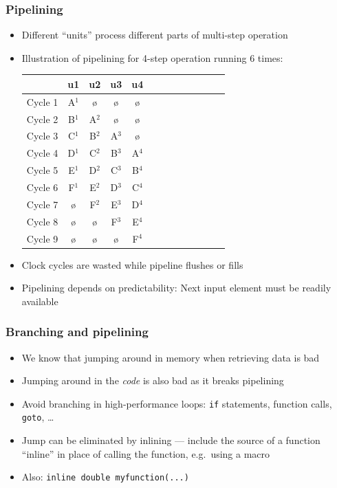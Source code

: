 \documentclass[usenames,dvipsnames,mathserif,compress]{beamer}
\begin{document}
\begin{frame}
  \frametitle{Pipelining}
  \begin{itemize}
  \item Different ``units'' process different parts of multi-step operation
  \item Illustration of pipelining for 4-step operation running 6 times:\\
    \begin{table}
    \begin{tabular}{c|cccccccccccc}
      & u1 &u2&u3&u4\\\hline
      Cycle 1 & A$^1$ &ø&ø&ø \\
      Cycle 2 & B$^1$ & A$^2$ &ø&ø \\
      Cycle 3 & C$^1$ & B$^2$ & A$^3$ &ø \\
      Cycle 4 & D$^1$ & C$^2$ & B$^3$ & A$^4$  \\
      Cycle 5 & E$^1$ & D$^2$ & C$^3$ & B$^4$   \\
      Cycle 6 & F$^1$ & E$^2$ & D$^3$ & C$^4$  \\
      Cycle 7 & ø     & F$^2$ & E$^3$ & D$^4$  \\
      Cycle 8 & ø & ø & F$^3$ & E$^4$  \\
      Cycle 9 & ø & ø & ø & F$^4$  \\
    \end{tabular}
    \end{table}
  \item Clock cycles are wasted while pipeline flushes or fills
  \item Pipelining depends on predictability: Next input element must be readily available
  \end{itemize}
\end{frame}

\begin{frame}
  \frametitle{Branching and pipelining}
  \begin{itemize}
  \item We know that jumping around in memory when retrieving data is bad
  \item Jumping around in the \emph{code} is also bad as it breaks pipelining
  \item Avoid branching in high-performance loops: \texttt{if} statements, function calls, \texttt{goto}, \ldots
  \item Jump can be eliminated by \alert{inlining} --- include the source of a function ``inline'' in place of calling the function, e.g.\ using a macro
  \item Also: \texttt{inline double myfunction(...)}
  \end{itemize}
\end{frame}
\end{document}
